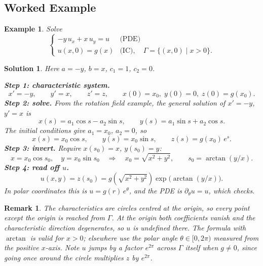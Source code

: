 \documentclass{article}
\newtheorem{solution}{Solution}
\newtheorem*{example}{Example}
\newtheorem{remark}{Remark}
\begin{document}
\subsection{Worked Example}
\begin{example}
    Solve
    \begin{equation}
        \begin{cases}
            -y\,u_x + x\,u_y = u & \text{(PDE)} \\
            u(x,0) = g(x) & \text{(IC)}, \quad \Gamma = \{(x,0) \mid x > 0\}.
        \end{cases}
    \end{equation}
\end{example}
\begin{solution}
    Here $a = -y$, $b = x$, $c_1 = 1$, $c_2 = 0$.\par
    \textbf{Step 1: characteristic system.}
    \begin{equation}
        x' = -y, \qquad y' = x, \qquad z' = z,
        \qquad
        x(0) = x_0,\; y(0) = 0,\; z(0) = g(x_0).
    \end{equation}
    \textbf{Step 2: solve.} From the rotation field example, the general solution of $x' = -y$, $y' = x$ is
    \begin{equation}
        x(s) = a_1 \cos s - a_2 \sin s, \qquad y(s) = a_1 \sin s + a_2 \cos s.
    \end{equation}
    The initial conditions give $a_1 = x_0$, $a_2 = 0$, so
    \begin{equation}
        x(s) = x_0 \cos s, \qquad y(s) = x_0 \sin s, \qquad z(s) = g(x_0)\, e^{s}.
    \end{equation}
    \textbf{Step 3: invert.} Require $x(s_0) = x$, $y(s_0) = y$:
    \begin{equation}
        x = x_0 \cos s_0, \quad y = x_0 \sin s_0
        \quad \Longrightarrow \quad
        x_0 = \sqrt{x^2 + y^2}, \qquad s_0 = \arctan(y/x).
    \end{equation}
    \textbf{Step 4: read off $u$.}
    \begin{equation}
        u(x,y) = z(s_0) = g\!\left(\sqrt{x^2 + y^2}\right) \exp\!\big(\arctan(y/x)\big).
    \end{equation}
    In polar coordinates this is $u = g(r)\,e^{\theta}$, and the PDE is $\partial_\theta u = u$, which checks.
\end{solution}
\begin{remark}
    The characteristics are circles centred at the origin, so every point except the origin is reached from $\Gamma$. At the origin both coefficients vanish and the characteristic direction degenerates, so $u$ is undefined there. The formula with $\arctan$ is valid for $x > 0$; elsewhere use the polar angle $\theta \in [0, 2\pi)$ measured from the positive $x$-axis. Note $u$ jumps by a factor $e^{2\pi}$ across $\Gamma$ itself when $g \neq 0$, since going once around the circle multiplies $z$ by $e^{2\pi}$.
\end{remark}
\end{document}
